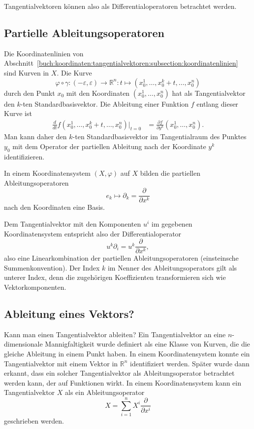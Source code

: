 Tangentialvektoren können also als Differentialoperatoren betrachtet
werden.

%
%
\subsection{Partielle Ableitungsoperatoren}
Die Koordinatenlinien von
Abschnitt~\ref{buch:koordinaten:tangentialvektoren:subsection:koordinatenlinien}
sind Kurven in $X$.
Die Kurve
\[
\varphi\circ\gamma
\colon
(-\varepsilon,\varepsilon)
\to
\mathbb{R}^n
:
t\mapsto (x_0^1,\dots,x_0^k+t,\dots,x_0^n)
\]
durch den Punkt $x_0$ mit den Koordinaten $(x_0^1,\dots,x_0^n)$
hat als Tangentialvektor den $k$-ten Standardbasisvektor.
Die Ableitung einer Funktion $f$ entlang dieser Kurve ist
\begin{align*}
\frac{d}{dt}
f(x_0^1,\dots,x_0^k+t,\dots,x_0^n)
\bigg|_{t=0}
&=
\frac{\partial f}{\partial y^k}(x_0^1,\dots,x_0^n).
\end{align*}
Man kann daher den $k$-ten Standardbasisvektor im Tangentialraum
des Punktes $y_0$ mit dem Operator der partiellen Ableitung nach
der Koordinate $y^k$ identifizieren.

\begin{satz}
In einem Koordinatensystem $(X,\varphi)$ auf $X$ bilden 
die partiellen Ableitungsoperatoren 
\[
e_k
\mapsto
\partial_k = \frac{\partial}{\partial x^k}
\]
nach den Koordinaten eine Basis.
\end{satz}

Dem Tangentialvektor mit den Komponenten $u^i$ im gegebenen
Koordinatensystem entspricht also der Differentialoperator
\[
u^k\partial_i = u^k\frac{\partial}{\partial x^k},
\]
also eine Linearkombination der partiellen Ableitungsoperatoren
(einsteinsche Summenkonvention).
Der Index $k$ im Nenner des Ableitungsoperators gilt als unterer
Index, denn die zugehörigen Koeffizienten transformieren sich
wie Vektorkomponenten.

%
%
\subsection{Ableitung eines Vektors?
\label{buch:koordinaten:diffop:subsection:vektorableitung}}
Kann man einen Tangentialvektor ableiten?
Ein Tangentialvektor an eine $n$-dimensionale Mannigfaltigkeit wurde
definiert als eine Klasse von Kurven, die die gleiche Ableitung in
einem Punkt haben.
In einem Koordinatensystem konnte ein Tangentialvektor mit einem
Vektor in $\mathbb{R}^n$ identifiziert werden.
Später wurde dann erkannt, dass ein solcher Tangentialvektor als
Ableitungsoperator betrachtet werden kann, der auf Funktionen
wirkt.
In einem Koordinatensystem kann ein Tangentialvektor $X$ als
ein Ableitungsoperator
\[
X
=
\sum_{i=1}^n
X^i \frac{\partial}{\partial x^i}
\]
geschrieben werden.

